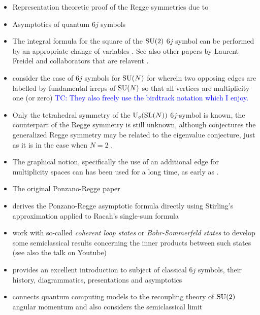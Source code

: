 \documentclass[notitlepage, 10pt]{article}
\begin{document}
\begin{itemize}
    \item Representation theoretic proof of the Regge symmetries due to \citeauthor{boalch2007regge} \cite{boalch2007regge}
    \item Asymptotics of quantum $6j$ symbols \citeauthor{taylor2006sixj} \cite{taylor2006sixj}
    \item The integral formula for the square of the $\operatorname{SU}(2)$ $6j$ symbol can be performed by an appropriate change of variables \cite{freidel2003asymptotics}. See also other papers by Laurent Freidel and collaborators that are relavent \cite{freidel2000simple,freidel20076j,freidel2010holomorphic}.
    \item \citeauthor{alcockspecial} consider the case of $6j$ symbols for $\operatorname{SU}(N)$ for wherein two opposing edges are labelled by fundamental irreps of $\operatorname{SU}(N)$ so that all vertices are multiplicity one (or zero) \cite{alcockspecial} \textcolor{blue}{TC: They also freely use the birdtrack notation which I enjoy.}
    \item Only the tetrahedral symmetry of the $\operatorname{U}_q(\operatorname{SL}(N))$ $6j$-symbol is known, the counterpart of the Regge symmetry is still unknown, although \citeauthor{morozov2018new} conjectures the generalized Regge symmetry may be related to the eigenvalue conjecture, just as it is in the case when $N=2$ \cite{morozov2018new}.
    \item The graphical notion, specifically the use of an additional edge for multiplicity spaces can has been used for a long time, as early as \cite{agrawala1968graphical,moussouris1984quantum}.
    \item The original Ponzano-Regge paper \cite{ponzano1968semiclassical}
    \item \citeauthor{gurau2008ponzano} derives the Ponzano-Regge asymptotic formula directly using Stirling's approximation applied to Racah's single-sum formula \cite{gurau2008ponzano}
    \item \citeauthor{bartlett2023coherent} work with so-called \textit{coherent loop states} or \textit{Bohr-Sommerfeld states} to develop some semiclassical results concerning the inner products between such states (see also the talk on Youtube) \cite{bartlett2023coherent}
    \item \citeauthor{aquilanti2012semiclassical} provides an excellent introduction to subject of classical $6j$ symbols, their history, diagrammatics, presentations and asymptotics \cite{aquilanti2012semiclassical}
    \item \citeauthor{marzuoli2005computing} connects quantum computing models to the recoupling theory of $\operatorname{SU}(2)$ angular momentum and also considers the semiclassical limit \cite{marzuoli2005computing}

\end{itemize}
\end{document}
